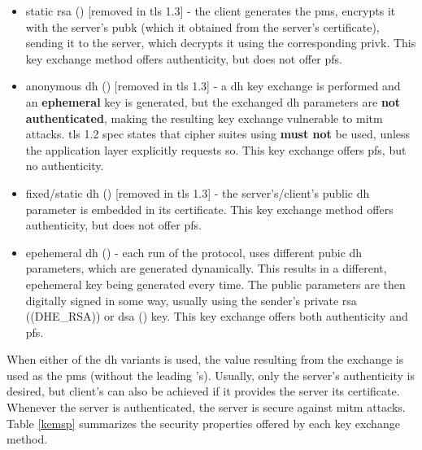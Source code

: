 \documentclass{llncs}
\begin{document}
\begin{itemize}
  \item static \gls{rsa} () [removed in \gls{tls} 1.3] - the client generates the \gls{pms}, encrypts it with the
  server's \gls{pubk} (which it obtained from the server's certificate),
  sending it to the server, which decrypts it using the corresponding \gls{privk}.
  This key exchange method offers authenticity, but does not offer \gls{pfs}.
  \item anonymous \gls{dh} () [removed in \gls{tls} 1.3] - a \gls{dh} key exchange is
  performed and an \textbf{ephemeral} key is generated, but the exchanged \gls{dh}
  parameters are \textbf{not authenticated}, making the resulting key exchange
  vulnerable to \gls{mitm} attacks. \gls{tls} 1.2 spec states that cipher suites
  using  \textbf{must not} be used, unless the application
  layer explicitly requests so. This key exchange offers \gls{pfs}, but no
  authenticity.
  \item fixed/static \gls{dh} () [removed in \gls{tls} 1.3] - the server's/client's public \gls{dh} parameter
  is embedded in its certificate. This key exchange method offers authenticity,
  but does not offer \gls{pfs}.
  \item epehemeral \gls{dh} () - each run of the protocol, uses
  different pubic \gls{dh} parameters, which are generated dynamically. This results
  in a different, epehemeral key being generated every time. The public parameters
  are then digitally signed in some way, usually using the sender's private
  \gls{rsa} (\codeword(DHE_RSA)) or \gls{dsa} () key. This key
  exchange offers both authenticity and \gls{pfs}.
\end{itemize}

When either of the \gls{dh} variants is used, the value resulting from the exchange is used
as the \gls{pms} (without the leading 's). Usually, only the server's
authenticity is desired, but client's can also be achieved if it provides the
server its certificate. Whenever the server is authenticated, the server is secure
against \gls{mitm} attacks. Table \ref{kemsp} summarizes the security properties
offered by each key exchange method.
\end{document}
